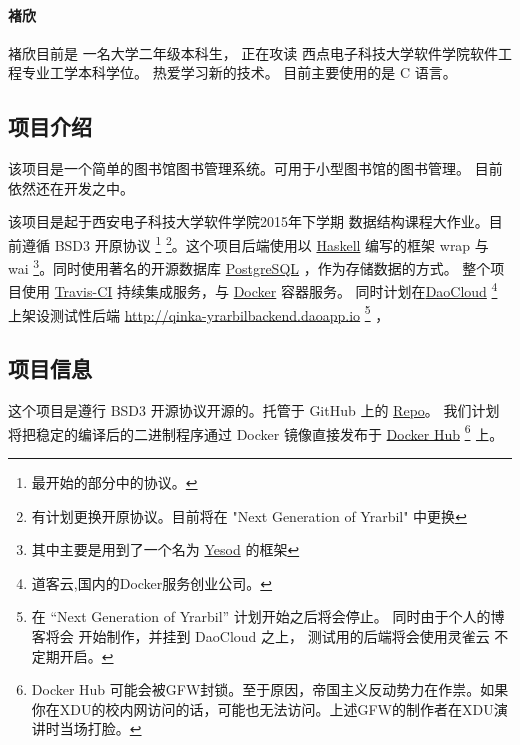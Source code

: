 \paragraph{褚欣}
褚欣目前是 一名大学二年级本科生，
正在攻读 西点电子科技大学软件学院软件工程专业工学本科学位。
热爱学习新的技术。
目前主要使用的是 C 语言。


\subsection*{项目介绍}
该项目是一个简单的图书馆图书管理系统。可用于小型图书馆的图书管理。
目前依然还在开发之中。

该项目是起于西安电子科技大学软件学院2015年下学期  数据结构课程大作业。目前遵循 BSD3 开原协议 \footnote{最开始的部分中的协议。} \footnote{有计划更换开原协议。目前将在 "Next Generation of Yrarbil" 中更换}。这个项目后端使用以 \href{https://www.haskell.org}{Haskell} 编写的框架 wrap 与 wai \footnote{其中主要是用到了一个名为 \href{https://www.yesodweb.com}{Yesod} 的框架}。同时使用著名的开源数据库
\href{http://www.postgresql.org}{PostgreSQL} ，作为存储数据的方式。
整个项目使用 \href{https://travis-ci.org}{Travis-CI} 持续集成服务，与 \href{https://www.docker.com/}{Docker} 容器服务。
同时计划在\href{https://www.daocloud.io}{DaoCloud}
\footnote{道客云,国内的Docker服务创业公司。}
上架设测试性后端 \href{YrabilBackend on DaoCloud}{http://qinka-yrarbilbackend.daoapp.io}
\footnote{在 “Next Generation of Yrarbil” 计划开始之后将会停止。
    同时由于个人的博客将会
    开始制作，并挂到 DaoCloud 之上， 测试用的后端将会使用灵雀云 不定期开启。} ，

\subsection*{项目信息}
这个项目是遵行 BSD3 开源协议开源的。托管于 GitHub 上的   \href{https://github.com/XDUDsTeam/}{Repo}。
我们计划将把稳定的编译后的二进制程序通过 Docker 镜像直接发布于
\href{https://hub.docker.com/}{Docker Hub}
\footnote{Docker Hub 可能会被GFW封锁。\tiny{至于原因，帝国主义反动势力在作祟。}如果你在XDU的校内网访问的话，可能也无法访问。上述GFW的制作者在XDU演讲时当场打脸。}
上。

